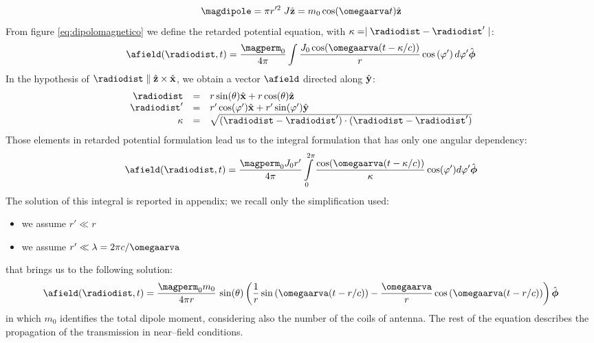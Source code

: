 \begin{equation}
\magdipole = \pi r'^2\; J \vrz = m_0 \cos(\omegaarva t) \vrz
\label{eq:dipolodacorrente}
\end{equation}
From figure \ref{eq:dipolomagnetico} we define the retarded potential equation, with ${\kappa = \mid \radiodist-\radiodist'\mid}$:
\[
\afield(\radiodist,t) = \dfrac{\magperm_0}{4\pi}\int{\dfrac{J_0\cos(\omegaarva (t - \kappa/c))}{r}\ccos{\varphi'}d\varphi'}\hat{\boldsymbol{\phi}}
\]
In the hypothesis of ${\radiodist\parallel\vrz\times\vrx}$, we obtain a vector $\afield$ directed along $\hat{\mathbf{y}}$:
\[\begin{array}{rcl}
\radiodist & = & r \sin(\theta) \vrx + r \cos(\theta) \vrz \\
\radiodist' & = & r' \cos(\varphi') \vrx + r' \sin(\varphi') \vry \\
\kappa & = & \sqrt{(\radiodist - \radiodist')\cdot(\radiodist - \radiodist')}
\end{array}\]
Those elements in retarded potential formulation lead us to the integral formulation that has only one angular dependency:
\begin{equation}
\label{eq:integraledacalc}
\afield(\radiodist,t) = \dfrac{\magperm_0 J_0 r'}{4\pi}\int\limits_{0}^{2\pi}{\dfrac{\cos(\omegaarva (t - \kappa/c))}{\kappa} \cos(\varphi') d\varphi' \hat{\boldsymbol{\phi}}}
\end{equation}
The solution of this integral is reported in appendix; we recall only the simplification used:
\begin{itemize}
\item we assume $r' \ll r$
\item we assume $r' \ll \lambda = 2\pi c/\omegaarva$
\end{itemize}
that brings us to the following solution:
\begin{equation}
\label{eq:soluzioneint}
\afield(\radiodist,t) = \dfrac{\magperm_0 m_0}{4\pi r}\,\sin(\theta)\left( \dfrac{1}{r} \sin\left(\omegaarva(t-r/c)\right) - \dfrac{\omegaarva}{r}\cos\left(\omegaarva(t-r/c)\right)\right)\hat{\boldsymbol{\phi}}
\end{equation}
in which $m_0$ identifies the total dipole moment, considering also the number of the coils of antenna. The rest of the equation describes the propagation of the transmission in near--field conditions.


